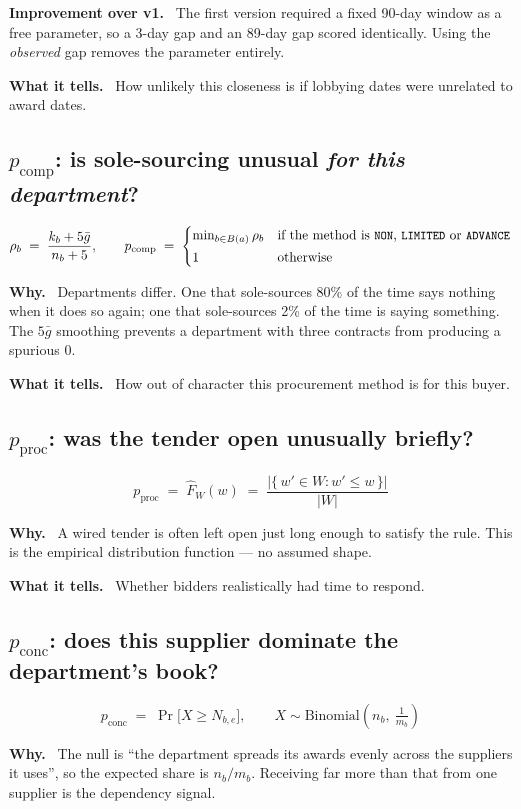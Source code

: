 \documentclass[11pt,a4paper]{article}
\newcommand{\field}[1]{\smallskip\noindent\textbf{#1}\ }
\newcommand{\code}[1]{\texttt{\small #1}}
\begin{document}
\field{Improvement over v1.}
The first version required a fixed 90-day window as a free parameter, so a 3-day gap and
an 89-day gap scored identically. Using the \emph{observed} gap removes the parameter
entirely.

\field{What it tells.} How unlikely this closeness is if lobbying dates were unrelated
to award dates.

\subsection*{$p_{\mathrm{comp}}$: is sole-sourcing unusual \emph{for this department}?}
\[
\rho_b \;=\; \frac{k_b + 5\bar{g}}{n_b + 5},
\qquad
p_{\mathrm{comp}} \;=\;
\begin{cases}
\min_{b \in B(a)} \rho_b & \text{if the method is \code{NON}, \code{LIMITED} or \code{ADVANCE}}\\[2pt]
1 & \text{otherwise}
\end{cases}
\]

\field{Why.}
Departments differ. One that sole-sources 80\% of the time says nothing when it does so
again; one that sole-sources 2\% of the time is saying something. The
$5\bar{g}$ smoothing prevents a department with three contracts from producing a
spurious $0$.

\field{What it tells.} How out of character this procurement method is for this buyer.

\subsection*{$p_{\mathrm{proc}}$: was the tender open unusually briefly?}
\[
p_{\mathrm{proc}} \;=\; \widehat{F}_W(w) \;=\; \frac{\bigl|\{\,w' \in W : w' \le w \,\}\bigr|}{|W|}
\]

\field{Why.}
A wired tender is often left open just long enough to satisfy the rule. This is the
empirical distribution function --- no assumed shape.

\field{What it tells.} Whether bidders realistically had time to respond.

\subsection*{$p_{\mathrm{conc}}$: does this supplier dominate the department's book?}
\[
p_{\mathrm{conc}} \;=\; \Pr\bigl[X \ge N_{b,e}\bigr],
\qquad X \sim \mathrm{Binomial}\!\left(n_b,\ \tfrac{1}{m_b}\right)
\]

\field{Why.}
The null is ``the department spreads its awards evenly across the suppliers it uses'', so
the expected share is $n_b/m_b$. Receiving far more than that from one supplier is the
dependency signal.
\end{document}
